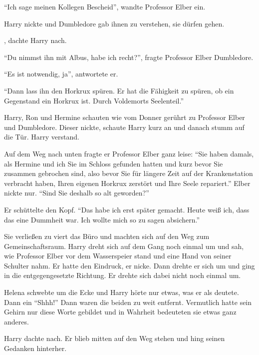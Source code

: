 \enquote{Ich sage meinen Kollegen Bescheid}, wandte Professor Elber ein.

Harry nickte und Dumbledore gab ihnen zu verstehen, sie dürfen gehen.

, dachte Harry nach.

\enquote{Du nimmst ihn mit Albus, habe ich recht?}, fragte Professor Elber Dumbledore.

\enquote{Es ist notwendig, ja}, antwortete er.

\enquote{Dann lass ihn den Horkrux spüren. Er hat die Fähigkeit zu spüren, ob ein Gegenstand ein Horkrux ist. Durch Voldemorts Seelenteil.}

Harry, Ron und Hermine schauten wie vom Donner gerührt zu Professor Elber und Dumbledore. Dieser nickte, schaute Harry kurz an und danach stumm auf die Tür. Harry verstand.

Auf dem Weg nach unten fragte er Professor Elber ganz leise: \enquote{Sie haben damals, als Hermine und ich Sie im Schloss gefunden hatten und kurz bevor Sie zusammen gebrochen sind, also bevor Sie für längere Zeit auf der Krankenstation verbracht haben, Ihren eigenen Horkrux zerstört und Ihre Seele repariert.} Elber nickte nur. \enquote{Sind Sie deshalb so alt geworden?}

Er schüttelte den Kopf. \enquote{Das habe ich erst später gemacht. Heute weiß ich, dass das eine Dummheit war. Ich wollte mich so zu sagen absichern.}

Sie verließen zu viert das Büro und machten sich auf den Weg zum Gemeinschaftsraum. Harry dreht sich auf dem Gang noch einmal um und sah, wie Professor Elber vor dem Wasserspeier stand und eine Hand von seiner Schulter nahm. Er hatte den Eindruck, er nicke. Dann drehte er sich um und ging in die entgegengesetzte Richtung. Er drehte sich dabei nicht noch einmal um.

Helena schwebte um die Ecke und Harry hörte nur etwas, was er als  deutete. Dann ein \enquote{Shhh!} Dann waren die beiden zu weit entfernt. Vermutlich hatte sein Gehirn nur diese Worte gebildet und in Wahrheit bedeuteten sie etwas ganz anderes.

\trenn

Harry dachte nach.  Er blieb mitten auf den Weg stehen und hing seinen Gedanken hinterher.

